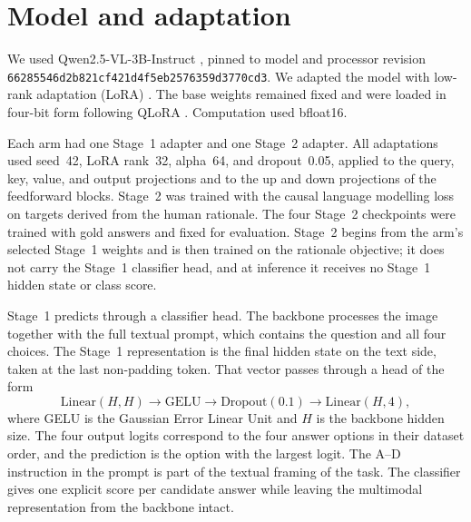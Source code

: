 \section{Model and adaptation}
\label{sec:setup-model}

We used Qwen2.5-VL-3B-Instruct
\citep{DBLP:journals/corr/abs-2502-13923}, pinned to model and processor
revision \texttt{66285546d2b821cf421d4f5eb2576359d3770cd3}. We adapted the
model with low-rank adaptation (LoRA)
\citep{DBLP:conf/iclr/HuSWALWWC22}. The base weights remained fixed and were
loaded in four-bit form following QLoRA
\citep{DBLP:conf/nips/DettmersPHZ23}. Computation used bfloat16.

Each arm had one Stage~1 adapter and one Stage~2 adapter. All adaptations used
seed~42, LoRA rank~32, alpha~64, and dropout~0.05, applied to the query, key,
value, and output projections and to the up and down projections of the
feedforward blocks. Stage~2 was trained with the causal language modelling loss on
targets derived from the human rationale. The four Stage~2 checkpoints were trained with
gold answers and fixed for evaluation. Stage~2 begins from the arm's selected
Stage~1 weights and is then trained on the rationale objective; it does not
carry the Stage~1 classifier head, and at inference it receives no Stage~1
hidden state or class score.

Stage~1 predicts through a classifier head. The backbone processes the image
together with the full textual prompt, which contains the question and all four
choices. The Stage~1 representation is
the final hidden state on the text side, taken at the last non-padding token. That vector
passes through a head of the form
\[
  \mathrm{Linear}(H,H)\rightarrow\mathrm{GELU}\rightarrow
  \mathrm{Dropout}(0.1)\rightarrow\mathrm{Linear}(H,4),
\]
where GELU is the Gaussian Error Linear Unit and $H$ is the backbone hidden
size. The four output logits correspond to the
four answer options in their dataset order, and the prediction is the option
with the largest logit. The A--D instruction in the prompt is part of the
textual framing of the task. The classifier gives one explicit score per
candidate answer while leaving the multimodal representation from the backbone
intact.

